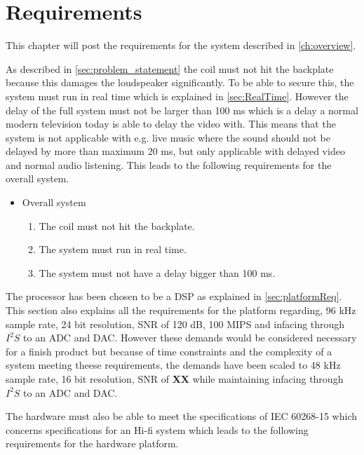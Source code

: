 \chapter{Requirements} \label{ch:requirements}
This chapter will post the requirements for the system described in \autoref{ch:overview}.  

As described in \autoref{sec:problem_statement} the coil must not hit the backplate because this damages the loudspeaker significantly. To be able to secure this, the system must run in real time which is explained in \autoref{sec:RealTime}. However the delay of the full system must not be larger than 100 ms which is a delay a normal modern television today is able to delay the video with. This means that the system is not applicable with e.g. live music where the sound should not be delayed by more than maximum 20 ms, but only applicable with delayed video and normal audio listening. This leads to the following requirements for the overall system.

\begin{itemize}
\item Overall system
\begin{enumerate}
\item [\textlabel{1}{coil}] The coil must not hit the backplate.\\
\item [\textlabel{2}{realtime}] The system must run in real time. \\
\item [\textlabel{3}{delay}] The system must not have a delay bigger than 100 ms.
\end{enumerate}
\end{itemize}

The processor has been chosen to be a DSP as explained in \autoref{sec:platformReq}. This section also explains all the requirements for the platform regarding, 96 kHz sample rate, 24 bit resolution, SNR of 120 dB, 100 MIPS and infacing through $I^2S$ to an ADC and DAC. However these demands would be considered necessary for a finish product but because of time constraints and the complexity of a system meeting theese requirements, the demands have been scaled to 48 kHz sample rate, 16 bit resolution, SNR of \textbf{XX} while maintaining infacing through $I^2S$ to an ADC and DAC. 

The hardware must also be able to meet the specifications of IEC 60268-15 which concerns specifications for an Hi-fi system which leads to the following requirements for the hardware platform.

